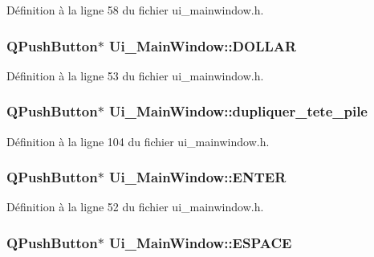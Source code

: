 \-Définition à la ligne 58 du fichier ui\-\_\-mainwindow.\-h.

\hypertarget{class_ui___main_window_a56acbb096ec7433f9afe533b440d8123}{
\subsubsection[{\-D\-O\-L\-L\-A\-R}]{\setlength{\rightskip}{0pt plus 5cm}\-Q\-Push\-Button$\ast$ {\bf \-Ui\-\_\-\-Main\-Window\-::\-D\-O\-L\-L\-A\-R}}}\label{class_ui___main_window_a56acbb096ec7433f9afe533b440d8123}


\-Définition à la ligne 53 du fichier ui\-\_\-mainwindow.\-h.

\hypertarget{class_ui___main_window_af9616decd222a39cd79adc405991d373}{
\subsubsection[{dupliquer\-\_\-tete\-\_\-pile}]{\setlength{\rightskip}{0pt plus 5cm}\-Q\-Push\-Button$\ast$ {\bf \-Ui\-\_\-\-Main\-Window\-::dupliquer\-\_\-tete\-\_\-pile}}}\label{class_ui___main_window_af9616decd222a39cd79adc405991d373}


\-Définition à la ligne 104 du fichier ui\-\_\-mainwindow.\-h.

\hypertarget{class_ui___main_window_a7d4645de7ef62f35bd4f0d0ff78a7611}{
\subsubsection[{\-E\-N\-T\-E\-R}]{\setlength{\rightskip}{0pt plus 5cm}\-Q\-Push\-Button$\ast$ {\bf \-Ui\-\_\-\-Main\-Window\-::\-E\-N\-T\-E\-R}}}\label{class_ui___main_window_a7d4645de7ef62f35bd4f0d0ff78a7611}


\-Définition à la ligne 52 du fichier ui\-\_\-mainwindow.\-h.

\hypertarget{class_ui___main_window_a2857c52a8366fe68798acdc44afa0fed}{
\subsubsection[{\-E\-S\-P\-A\-C\-E}]{\setlength{\rightskip}{0pt plus 5cm}\-Q\-Push\-Button$\ast$ {\bf \-Ui\-\_\-\-Main\-Window\-::\-E\-S\-P\-A\-C\-E}}}\label{class_ui___main_window_a2857c52a8366fe68798acdc44afa0fed}


